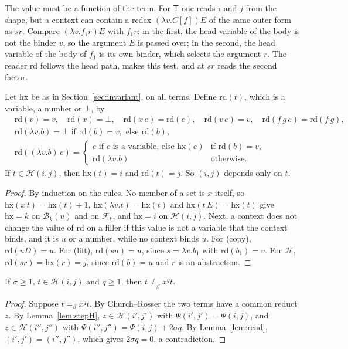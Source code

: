 \documentclass[a4paper,english]{lipics-v2021}
\newcommand{\T}{\mathsf{T}}
\newcommand{\eqb}{=_{\beta}}
\newcommand{\neqb}{\neq_{\beta}}
\newcommand{\hx}{\mathrm{hx}}
\newcommand{\rd}{\mathrm{rd}}
\newcommand{\Fam}{\mathcal{F}}
\newcommand{\Bod}{\mathcal{B}}
\newcommand{\Hst}{\mathcal{H}}
\begin{document}
The value must be a function of the term. For $\T$ one reads $i$ and $j$ from the shape, but a context can contain a redex $(\lambda v.C[f])E$ of the same outer form as $sr$. Compare $(\lambda v.f_1r)E$ with $f_1r$: in the first, the head variable of the body is not the binder $v$, so the argument $E$ is passed over; in the second, the head variable of the body of $f_1$ is its own binder, which selects the argument $r$. The reader $\rd$ follows the head path, makes this test, and at $sr$ reads the second factor.

\begin{lemma}\label{lem:read}
Let $\hx$ be as in Section~\ref{sec:invariant}, on all terms. Define $\rd(t)$, which is a variable, a number or $\bot$, by
\begin{align*}
&\rd(v) = v,\quad \rd(x) = \bot,\quad \rd(x\,e) = \rd(e),\quad \rd(v\,e) = v,\quad \rd(f\,g\,e) = \rd(f\,g),\\
&\rd(\lambda v.b) = \bot \text{ if } \rd(b) = v, \text{ else } \rd(b),\\
&\rd((\lambda v.b)\,e) = \begin{cases} e \text{ if } e \text{ is a variable, else } \hx(e) & \text{if } \rd(b) = v,\\ \rd(\lambda v.b) & \text{otherwise.}\end{cases}
\end{align*}
If $t \in \Hst(i,j)$, then $\hx(t) = i$ and $\rd(t) = j$. So $(i,j)$ depends only on $t$.
\end{lemma}

\begin{proof}
By induction on the rules. No member of a set is $x$ itself, so $\hx(x\,t) = \hx(t)+1$, $\hx(\lambda v.t) = \hx(t)$ and $\hx(t\,E) = \hx(t)$ give $\hx = k$ on $\Bod_k(u)$ and on $\Fam_k$, and $\hx = i$ on $\Hst(i,j)$. Next, a context does not change the value of $\rd$ on a filler if this value is not a variable that the context binds, and it is $u$ or a number, while no context binds $u$. For (copy), $\rd(uD) = u$. For (lift), $\rd(su) = u$, since $s = \lambda v.b_1$ with $\rd(b_1) = v$. For $\Hst$, $\rd(sr) = \hx(r) = j$, since $\rd(b) = u$ and $r$ is an abstraction.
\end{proof}

\begin{theorem}\label{thm:state}
If $\sigma \geq 1$, $t \in \Hst(i,j)$ and $q \geq 1$, then $t \neqb x^qt$.
\end{theorem}

\begin{proof}
Suppose $t \eqb x^qt$. By Church--Rosser the two terms have a common reduct $z$. By Lemma~\ref{lem:stepH}, $z \in \Hst(i',j')$ with $\Psi(i',j') = \Psi(i,j)$, and $z \in \Hst(i'',j'')$ with $\Psi(i'',j'') = \Psi(i,j)+2\sigma q$. By Lemma~\ref{lem:read}, $(i',j') = (i'',j'')$, which gives $2\sigma q = 0$, a contradiction.
\end{proof}
\end{document}
